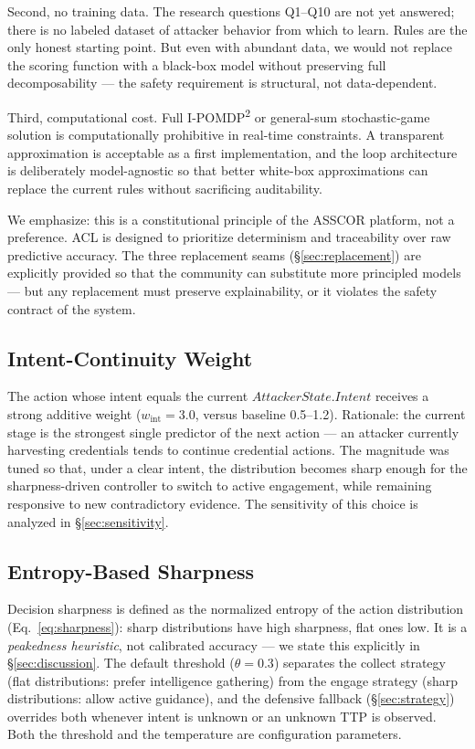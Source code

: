 \documentclass[11pt]{article}
\begin{document}
Second, no training data. The research questions Q1--Q10 are not yet answered; there is no labeled dataset of attacker behavior from which to learn. Rules are the only honest starting point. But even with abundant data, we would not replace the scoring function with a black-box model without preserving full decomposability --- the safety requirement is structural, not data-dependent.

Third, computational cost. Full I-POMDP\textsuperscript{2} or general-sum stochastic-game solution is computationally prohibitive in real-time constraints. A transparent approximation is acceptable as a first implementation, and the loop architecture is deliberately model-agnostic so that better white-box approximations can replace the current rules without sacrificing auditability.

We emphasize: this is a constitutional principle of the ASSCOR platform, not a preference. ACL is designed to prioritize determinism and traceability over raw predictive accuracy. The three replacement seams (\S\ref{sec:replacement}) are explicitly provided so that the community can substitute more principled models --- but any replacement must preserve explainability, or it violates the safety contract of the system.

\subsection{Intent-Continuity Weight}

The action whose intent equals the current $\mathit{AttackerState.Intent}$
receives a strong additive weight ($w_{\mathrm{int}} = 3.0$, versus baseline
0.5--1.2). Rationale: the current stage is the strongest single predictor of
the next action --- an attacker currently harvesting credentials tends to
continue credential actions. The magnitude was tuned so that, under a clear
intent, the distribution becomes sharp enough for the sharpness-driven
controller to switch to active engagement, while remaining responsive to new
contradictory evidence. The sensitivity of this choice is analyzed in
\S\ref{sec:sensitivity}.

\subsection{Entropy-Based Sharpness}

Decision sharpness is defined as the normalized entropy of the action
distribution (Eq.~\ref{eq:sharpness}): sharp distributions have high
sharpness, flat ones low. It is a \textit{peakedness heuristic}, not
calibrated accuracy --- we state this explicitly in \S\ref{sec:discussion}.
The default threshold ($\theta = 0.3$) separates the collect strategy (flat
distributions: prefer intelligence gathering) from the engage strategy
(sharp distributions: allow active guidance), and the defensive fallback
(\S\ref{sec:strategy}) overrides both whenever intent is unknown or an
unknown TTP is observed. Both the threshold and the temperature are
configuration parameters.
\end{document}
